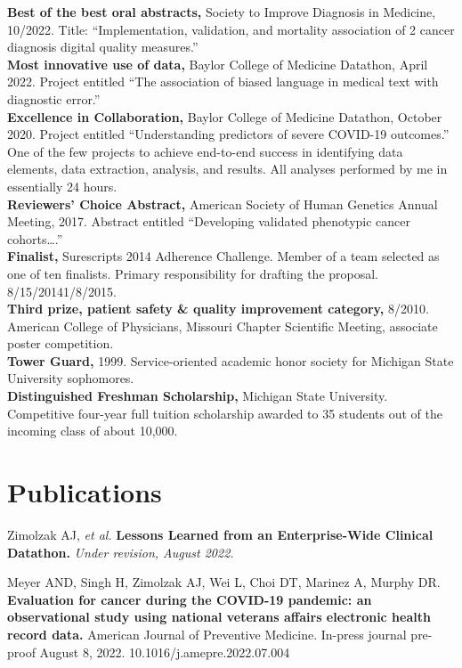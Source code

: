 \documentclass[10pt]{article}
\begin{document}
\textbf{Best of the best oral abstracts,} Society to Improve Diagnosis
in Medicine, 10/2022. Title: ``Implementation, validation, and
mortality association of 2 cancer diagnosis digital quality
measures.''\\
\textbf{Most innovative use of data,} Baylor College of Medicine
Datathon, April 2022. Project entitled ``The association of biased
language in medical text with diagnostic error.''\\
\textbf{Excellence in Collaboration,} Baylor College of Medicine
Datathon, October 2020. Project entitled ``Understanding predictors of
severe COVID-19 outcomes.'' One of the few projects to achieve
end-to-end success in identifying data elements, data extraction,
analysis, and results. All analyses performed by me in essentially 24
hours.\\
\textbf{Reviewers' Choice Abstract,} American Society of Human
Genetics Annual Meeting, 2017. Abstract entitled ``Developing
validated phenotypic cancer cohorts\ldots{}.''\\
\textbf{Finalist,} Surescripts 2014 Adherence Challenge. Member of a
team selected as one of ten finalists. Primary responsibility for
drafting the proposal. 8/15/2014\ndash{}1/8/2015.\\
\textbf{Third prize, patient safety \& quality improvement category,}
8/2010. American College of Physicians, Missouri Chapter Scientific
Meeting, associate poster competition.\\
\textbf{Tower Guard,} 1999. Service-oriented academic honor
society for Michigan State University sophomores.\\
\textbf{Distinguished Freshman Scholarship,} Michigan State
University. Competitive four-year full tuition scholarship awarded to
35 students out of the incoming class of about 10,000.




\section*{Publications}


Zimolzak AJ, \emph{et al.} \textbf{Lessons Learned from an
  Enterprise-Wide Clinical Datathon.} \emph{Under revision, August
2022.}

Meyer AND, Singh H, Zimolzak AJ, Wei L, Choi DT, Marinez A, Murphy DR.
\textbf{Evaluation for cancer during the COVID-19 pandemic: an
  observational study using national veterans affairs electronic
  health record data.} American Journal of Preventive Medicine.
In-press journal pre-proof August 8, 2022. 10.1016/j.amepre.2022.07.004
\end{document}
